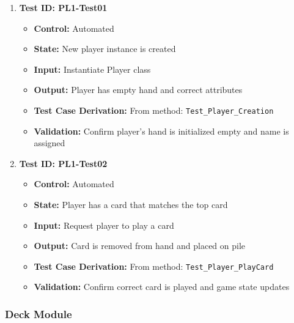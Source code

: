 \documentclass[12pt]{article}
\begin{document}
\begin{enumerate}
    \item \textbf{Test ID: PL1-Test01}
    \begin{itemize}
        \item \textbf{Control:} Automated
        \item \textbf{State:} New player instance is created
        \item \textbf{Input:} Instantiate Player class
        \item \textbf{Output:} Player has empty hand and correct attributes
        \item \textbf{Test Case Derivation:} From method: \texttt{Test\_Player\_Creation}
        \item \textbf{Validation:} Confirm player's hand is initialized empty and name is assigned
    \end{itemize}

    \item \textbf{Test ID: PL1-Test02}
    \begin{itemize}
        \item \textbf{Control:} Automated
        \item \textbf{State:} Player has a card that matches the top card
        \item \textbf{Input:} Request player to play a card
        \item \textbf{Output:} Card is removed from hand and placed on pile
        \item \textbf{Test Case Derivation:} From method: \texttt{Test\_Player\_PlayCard}
        \item \textbf{Validation:} Confirm correct card is played and game state updates
    \end{itemize}
\end{enumerate}

\subsubsection{Deck Module}
\end{document}
